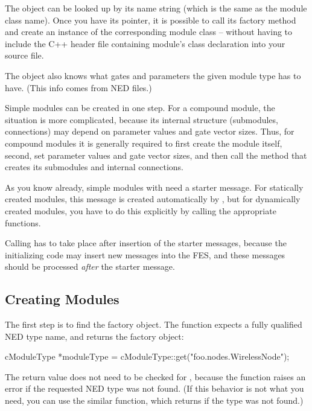 The  object can be looked up by its name
string (which is the same as the module class name). Once you have its
pointer, it is possible to call its factory method and create an
instance of the corresponding module class -- without having to
include the C++ header file containing module's class declaration
into your source file.

The  object also knows what gates and
parameters the given module type has to have. (This info comes from
NED files.)

Simple modules can be created in one step. For a compound module, the
situation is more complicated, because its internal structure
(submodules, connections) may depend on parameter values and gate
vector sizes. Thus, for compound modules it is generally required to
first create the module itself, second, set parameter values and gate
vector sizes, and then call the method that creates its submodules and
internal connections.

As you know already, simple modules with  need a
starter message. For statically created
modules, this message is created automatically by {\opp}, but for
dynamically created modules, you have to do this explicitly by calling
the appropriate functions.

Calling  has to take place after insertion of the
starter messages, because the initializing code may insert new messages
into the FES, and these messages should be processed
\textit{after} the starter message.


\subsection{Creating Modules}

The first step is to find the factory object. The 
function expects a fully qualified NED type name, and returns the factory
object:

\begin{cpp}
cModuleType *moduleType = cModuleType::get("foo.nodes.WirelessNode");
\end{cpp}

The return value does not need to be checked for , because
the function raises an error if the requested NED type was not found.
(If this behavior is not what you need, you can use the similar
 function, which returns  if the type
was not found.)

